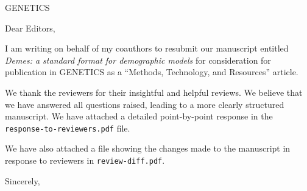 \documentclass{letter}
\begin{document}
\begin{letter}{GENETICS}

\opening{Dear Editors,}

I am writing on behalf of my coauthors to resubmit our manuscript entitled
\emph{Demes: a standard format for demographic models}
for consideration for publication in GENETICS
as a ``Methods, Technology, and Resources'' article.

We thank the reviewers for their insightful and helpful reviews. We
believe that we have answered all questions raised, leading to a more
clearly structured manuscript. We have attached
a detailed point-by-point response in the \texttt{response-to-reviewers.pdf}
file.

We have also attached a file showing the changes made to the manuscript
in response to reviewers in \texttt{review-diff.pdf}.

\closing{Sincerely,}

\end{letter}
\end{document}
